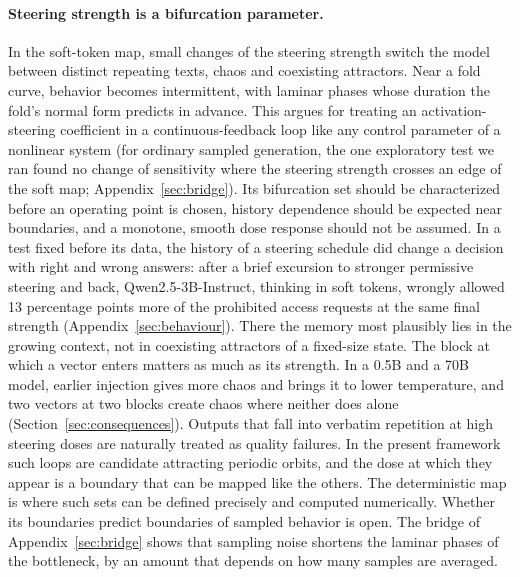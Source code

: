 \documentclass[11pt,letterpaper]{article}
\begin{document}
\paragraph{Steering strength is a bifurcation parameter.} In the soft-token map, small changes of the steering
strength switch the model between distinct repeating texts, chaos and coexisting attractors. Near a fold curve,
behavior becomes intermittent, with laminar phases whose duration the fold's normal form predicts in advance. This argues for treating
an activation-steering coefficient in a continuous-feedback loop like any control parameter of a nonlinear system (for ordinary sampled generation, the one exploratory test we ran found no change of sensitivity where the steering strength crosses an edge of the soft map; Appendix~\ref{sec:bridge}). Its bifurcation set should be
characterized before an operating point is chosen, history dependence should be expected near boundaries, and a
monotone, smooth dose response should not be assumed. In a test fixed before its data, the history of a steering
schedule did change a decision with right and wrong answers: after a brief excursion to stronger permissive steering
and back, Qwen2.5-3B-Instruct, thinking in soft tokens, wrongly allowed 13 percentage points more of the prohibited
access requests at the same final strength (Appendix~\ref{sec:behaviour}). There the memory most plausibly lies in
the growing context, not in coexisting attractors of a fixed-size state. The block at which a vector enters matters as much as its
strength. In a 0.5B and a 70B model, earlier injection gives more chaos and brings it to lower temperature, and two
vectors at two blocks create chaos where neither does alone (Section~\ref{sec:consequences}). Outputs that fall into verbatim repetition at high steering
doses are naturally treated as quality failures. In the present framework such loops are candidate attracting
periodic orbits, and the dose at which they appear is a boundary that can be mapped like the others. The
deterministic map is where such sets can be defined precisely and computed numerically. Whether its boundaries
predict boundaries of sampled behavior is open. The bridge of Appendix~\ref{sec:bridge} shows that sampling noise
shortens the laminar phases of the bottleneck, by an amount that depends on how many samples are averaged.
\end{document}
